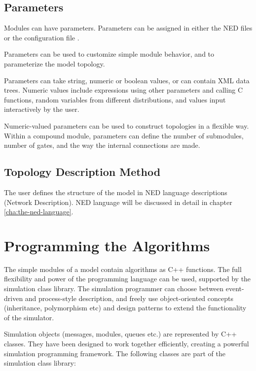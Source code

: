 \subsection{Parameters}

Modules can have parameters. Parameters can be assigned  in either
the NED files or the configuration file .

Parameters can be used to customize simple module behavior,
and to parameterize the model topology.

Parameters can take string, numeric or boolean values, or can
contain XML data trees. Numeric values include expressions using
other parameters and calling C functions, random variables from
different distributions, and values input interactively by the user.

Numeric-valued parameters can be used to construct topologies in a
flexible way. Within a compound module, parameters can define the
number of submodules, number of gates, and the way the internal
connections are made.


\subsection{Topology Description Method}

The user defines the structure of the model in NED language descriptions
(Network Description). NED language will be discussed in detail
in chapter \ref{cha:the-ned-language}.


\section{Programming the Algorithms}

The simple modules of a model contain algorithms
as C++ functions.
The full flexibility and power of the programming language can
be used, supported by the {\opp} simulation class library.
The simulation programmer can choose between event-driven and process-style
description, and freely use object-oriented concepts
(inheritance, polymorphism etc) and design patterns to extend the
functionality of the simulator.

Simulation objects (messages, modules, queues etc.) are represented
by C++ classes. They have been designed to work together efficiently,
creating a powerful simulation programming framework.
The following classes are part of the simulation class library:

